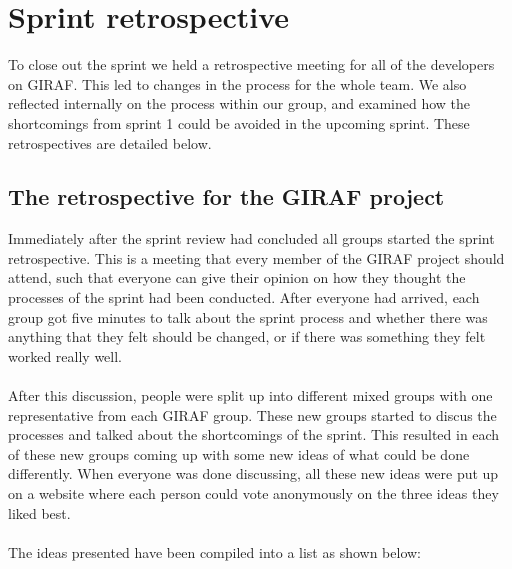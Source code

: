\section{Sprint retrospective}
To close out the sprint we held a retrospective meeting for all of the developers on GIRAF.
This led to changes in the process for the whole team.
We also reflected internally on the process within our group, and examined how the shortcomings from sprint 1 could be avoided in the upcoming sprint.
These retrospectives are detailed below.

\subsection{The retrospective for the GIRAF project}\label{retro1giraf}
Immediately after the sprint review had concluded all groups started the sprint retrospective.
This is a meeting that every member of the GIRAF project should attend, such that everyone can give their opinion on how they thought the processes of the sprint had been conducted.
After everyone had arrived, each group got five minutes to talk about the sprint process and whether there was anything that they felt should be changed, or if there was something they felt worked really well.
\\\\
After this discussion, people were split up into different mixed groups with one representative from each GIRAF group.
These new groups started to discus the processes and talked about the shortcomings of the sprint.
This resulted in each of these new groups coming up with some new ideas of what could be done differently.
When everyone was done discussing, all these new ideas were put up on a website where each person could vote anonymously on the three ideas they liked best.
\\\\
The ideas presented have been compiled into a list as shown below:
